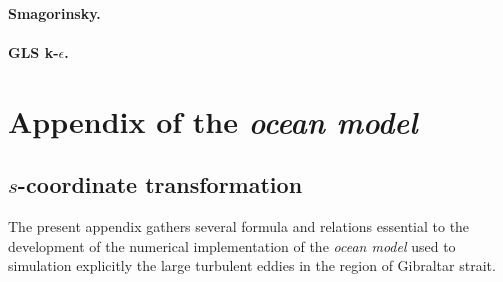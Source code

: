 \paragraph{Smagorinsky.}


\paragraph{GLS k-$\epsilon$.}



\section{Appendix of the \textit{ocean model}}

\subsection{$s$-coordinate transformation}
\label{section_annexe2}
\color{blue}The present appendix gathers several formula and relations essential to the development of the numerical implementation of the \textit{ocean model} used to simulation explicitly the large turbulent eddies in the region of Gibraltar strait.\color{black}
%
